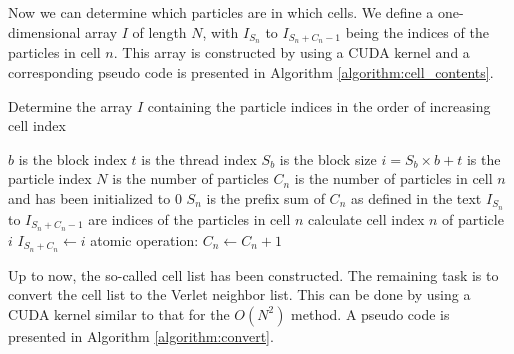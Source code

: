 \documentclass[12pt,a4paper]{report}
\begin{document}
Now we can determine which particles are in which cells. We define a one-dimensional array $I$ of length $N$, with $I_{S_n}$ to $I_{S_n + C_n - 1}$ being the indices of the particles in cell $n$. This array is constructed by using a CUDA kernel and a corresponding pseudo code is presented in Algorithm \ref{algorithm:cell_contents}.

\begin{algorithm}[htbp]
\caption{Determine the array $I$  containing the particle indices in the order of increasing cell index}
\label{algorithm:cell_contents}
\begin{algorithmic}[1]
\Require $b$ is the block index
\Require $t$ is the thread index
\Require $S_b$ is the block size
\Require $i=S_b\times b+t$ is the particle index
\Require $N$ is the number of particles
\Require $C_n$ is the number of particles in cell $n$ and has been initialized to 0
\Require $S_n$ is the prefix sum of $C_n$ as defined in the text
\Require $I_{S_n}$ to $I_{S_n + C_n - 1}$ are indices of the particles in cell $n$
	\State calculate cell index $n$ of particle $i$
    \State $I_{S_n + C_n} \leftarrow i$
	\State atomic operation: $C_n \leftarrow C_n +1$
\EndIf
 \end{algorithmic}
\end{algorithm}

Up to now, the so-called cell list has been constructed. The remaining task is to convert the cell list to the Verlet neighbor list. This can be done by using a CUDA kernel similar to that for the $O(N^2)$ method. A pseudo code is presented in Algorithm \ref{algorithm:convert}.
\end{document}
